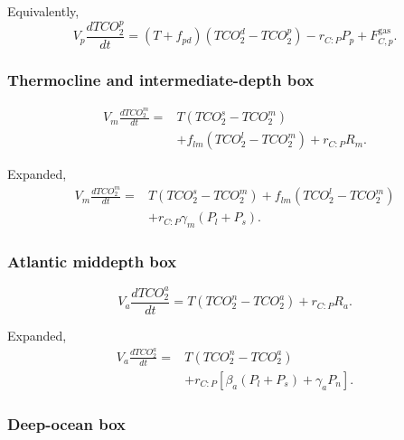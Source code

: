 \documentclass[11pt]{article}
\begin{document}
Equivalently,
\begin{equation}
V_p\frac{dTCO_2^p}{dt}
=
\left(T+f_{pd}\right)
\left(
TCO_2^d-TCO_2^p
\right)
-
r_{C:P}P_p
+
F^{\mathrm{gas}}_{C,p}.
\label{eq:seven_tco2_p_compact}
\end{equation}

\subsubsection{Thermocline and intermediate-depth box}

\begin{equation}
\begin{split}
V_m\frac{dTCO_2^m}{dt}
={}&
T
\left(
TCO_2^s-TCO_2^m
\right)
\\
&+
f_{lm}
\left(
TCO_2^l-TCO_2^m
\right)
+
r_{C:P}R_m.
\end{split}
\label{eq:seven_tco2_m}
\end{equation}

Expanded,
\begin{equation}
\begin{split}
V_m\frac{dTCO_2^m}{dt}
={}&
T
\left(
TCO_2^s-TCO_2^m
\right)
+
f_{lm}
\left(
TCO_2^l-TCO_2^m
\right)
\\
&+
r_{C:P}
\gamma_m
\left(
P_l+P_s
\right).
\end{split}
\label{eq:seven_tco2_m_expanded}
\end{equation}

\subsubsection{Atlantic middepth box}

\begin{equation}
V_a\frac{dTCO_2^a}{dt}
=
T
\left(
TCO_2^n-TCO_2^a
\right)
+
r_{C:P}R_a.
\label{eq:seven_tco2_a}
\end{equation}

Expanded,
\begin{equation}
\begin{split}
V_a\frac{dTCO_2^a}{dt}
={}&
T
\left(
TCO_2^n-TCO_2^a
\right)
\\
&+
r_{C:P}
\left[
\beta_a
\left(
P_l+P_s
\right)
+
\gamma_aP_n
\right].
\end{split}
\label{eq:seven_tco2_a_expanded}
\end{equation}

\subsubsection{Deep-ocean box}
\end{document}
